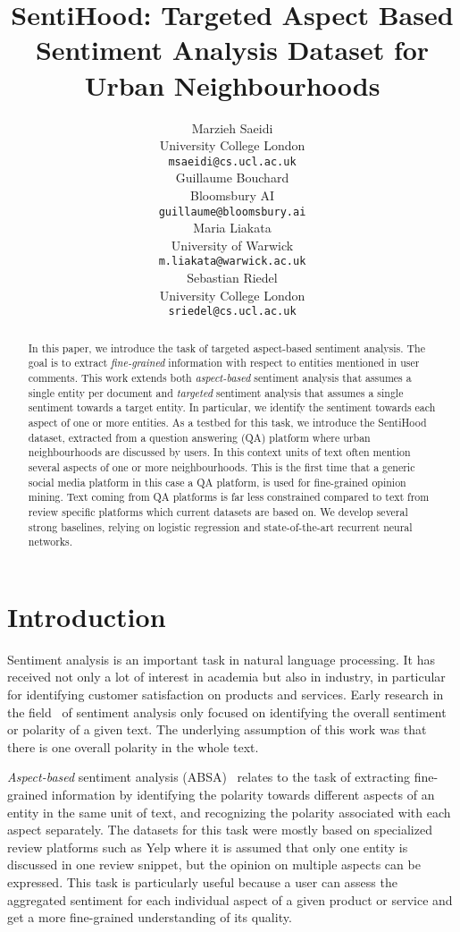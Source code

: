 \documentclass[11pt]{article}
\title{SentiHood: Targeted Aspect Based Sentiment Analysis Dataset for Urban Neighbourhoods}
\author{
  Marzieh Saeidi \\
  University College London \\
  {\tt msaeidi@cs.ucl.ac.uk} \\\And
  Guillaume Bouchard \\
  Bloomsbury AI \\
  {\tt guillaume@bloomsbury.ai} \\
  \AND
  Maria Liakata  \\
  University of Warwick \\
  {\tt m.liakata@warwick.ac.uk} \\\And
  Sebastian Riedel \\
  University College London \\
  {\tt sriedel@cs.ucl.ac.uk} \\
}
\begin{document}
\maketitle

\begin{abstract}
   In this paper, we introduce the task of targeted aspect-based sentiment analysis. The goal is to extract \emph{fine-grained} information with respect to entities mentioned in user comments. This work extends both \emph{aspect-based} sentiment analysis that assumes a single entity per document and \emph{targeted} sentiment analysis that assumes a single sentiment towards a target entity. In particular, we identify the sentiment towards each aspect of one or more entities. As a testbed for this task, we introduce the SentiHood dataset, extracted from a question answering (QA) platform where urban neighbourhoods are discussed by users. In this context units of text often mention several aspects of one or more neighbourhoods. This is the first time that a generic social media platform in this case a QA platform, is used for fine-grained opinion mining. Text coming from QA platforms is far less constrained compared to text from review specific platforms which current datasets are based on. We develop several strong baselines, relying on logistic regression and state-of-the-art recurrent neural networks.
\end{abstract}

\section{Introduction}
\label{intro}

    Sentiment analysis is an important task in natural language processing. It has received not only a lot of interest in academia but also in industry, in particular for identifying customer satisfaction on products and services. Early research in the field~\cite{das2001yahoo,morinaga2002mining} of sentiment analysis only focused on identifying the overall sentiment or polarity of a given text. The underlying assumption of this work was that there is one overall polarity in the whole text.
    
    \emph{Aspect-based} sentiment analysis (ABSA)~\cite{jo2011aspect,pontiki2015semeval,SemEval_2016_task5} relates to the task of extracting fine-grained information by identifying the polarity towards different aspects of an entity in the same unit of text, and recognizing the polarity associated with each aspect separately. The datasets for this task were mostly based on specialized review platforms such as Yelp where it is assumed that only one entity is discussed in one review snippet, but the opinion on multiple aspects can be expressed. This task is particularly useful because a user can assess the aggregated sentiment for each individual aspect of a given product or service and get a more fine-grained understanding of its quality.
    
\end{document}
